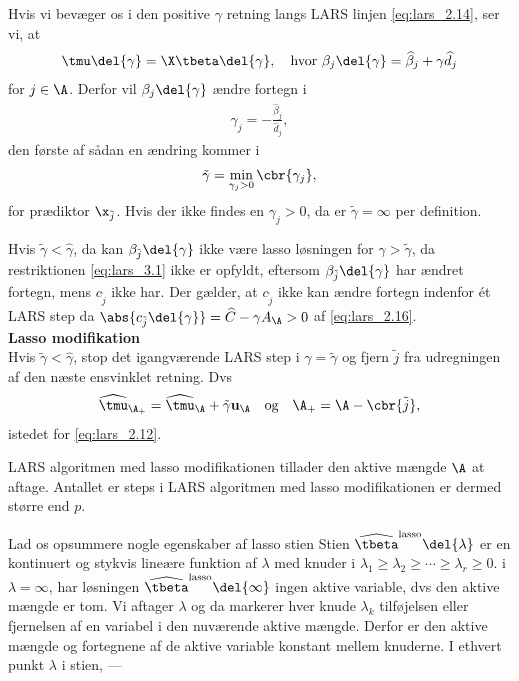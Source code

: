 Hvis vi bevæger os i den positive \(\gamma\) retning langs LARS linjen \eqref{eq:lars_2.14}, ser vi, at
\begin{align*}
\tmu \del{\gamma} = \X \tbeta \del{\gamma}, \quad \text{hvor } \beta_j \del{\gamma} = \widehat{\beta}_j + \gamma \widehat{d}_j
\end{align*}
for \(j \in \A\).
Derfor vil \(\beta_j \del{\gamma}\) ændre fortegn i
\begin{align*}
\gamma_j = -\frac{\widehat{\beta}_j}{\widehat{d}_j},
\end{align*}
den første af sådan en ændring kommer i
\begin{align*}
\tilde{\gamma} = \min_{\gamma_j > 0} \cbr{\gamma_j},
\end{align*}
for prædiktor \(\x_{\tilde{j}}\).
Hvis der ikke findes en \(\gamma_j > 0\), da er \(\tilde{\gamma}=\infty\) per definition.

Hvis \(\tilde{\gamma} < \widehat{\gamma}\), da kan \(\beta_{\tilde{j}} \del{\gamma}\) ikke være lasso løsningen for \(\gamma > \tilde{\gamma}\), da restriktionen \eqref{eq:lars_3.1} ikke er opfyldt, eftersom \(\beta_{\tilde{j}} \del{\gamma}\) har ændret fortegn, mens \(c_{\tilde{j}}\) ikke har.
Der gælder, at \(c_{\tilde{j}}\) ikke kan ændre fortegn indenfor ét LARS step da \(\abs{c_{\tilde{j}} \del{\gamma}} = \widehat{C} - \gamma A_\A> 0\) af \eqref{eq:lars_2.16}. \\[2mm]
%
\textbf{Lasso modifikation} \\
Hvis \(\tilde{\gamma} < \widehat{\gamma}\), stop det igangværende LARS step i \(\gamma = \tilde{\gamma}\) og fjern \(\tilde{j}\) fra udregningen af den næste ensvinklet retning.
Dvs
\begin{align*}
\widehat{\tmu}_{\A_+} = \widehat{\tmu}_\A + \tilde{\gamma} \mathbf{u}_\A \quad \text{og} \quad \A_+ = \A - \cbr{\tilde{j}},
\end{align*}
istedet for \eqref{eq:lars_2.12}.

LARS algoritmen med lasso modifikationen tillader den aktive mængde \(\A\) at aftage.
Antallet er steps i LARS algoritmen med lasso modifikationen er dermed større end \(p\).


Lad os opsummere nogle egenskaber af lasso stien
Stien \(\widehat{\tbeta}^\text{lasso} \del{\lambda}\) er en kontinuert og stykvis lineære funktion af \(\lambda\) med knuder i \(\lambda_1 \geq \lambda_2 \geq \cdots \geq \lambda_r \geq 0\).
i \(\lambda = \infty\), har løsningen \(\widehat{\tbeta}^\text{lasso} \del{\infty}\) ingen aktive variable, dvs den aktive mængde er tom. 
Vi aftager \(\lambda\) og da markerer hver knude \(\lambda_k\) tilføjelsen eller fjernelsen af en variabel i den nuværende aktive mængde.
Derfor er den aktive mængde og fortegnene af de aktive variable konstant mellem knuderne.
I ethvert punkt \(\lambda\) i stien,
---

